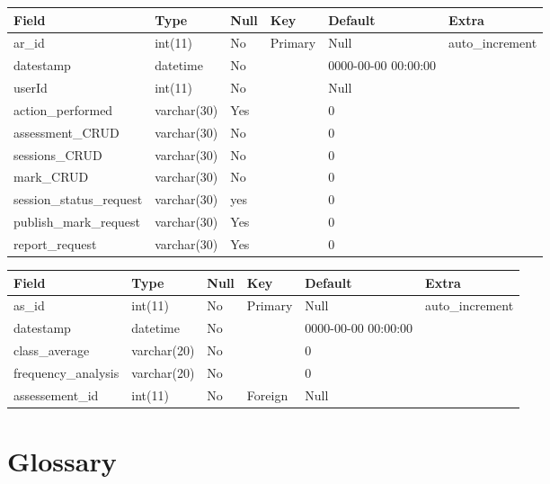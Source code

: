 \documentclass[12pt]{article}
\begin{document}
					
					
					\begin{tabular}{|p{1.1in}|p{0.9in}|p{0.5in}|p{0.4in}|p{1.0in}|p{0.9in}|} \hline 
					Field & Type & Null & Key & Default & Extra \\ \hline 
					ar\_id & int(11) & No & Primary & Null & auto\_increment \\ \hline 
					datestamp & datetime & No &  & 0000-00-00 00:00:00 &  \\ \hline 
					userId & int(11) & No &  & Null &  \\ \hline 
					action\_performed & varchar(30) & Yes &  & 0 &  \\ \hline 
					assessment\_CRUD & varchar(30) & No &  & 0 &  \\ \hline 
					sessions\_CRUD & varchar(30) & No &  & 0 &  \\ \hline 
					mark\_CRUD & varchar(30) & No &  & 0 &  \\ \hline 
					session\_status\_request & varchar(30) & yes &  & 0 &  \\ \hline 
					publish\_mark\_request & varchar(30) & Yes &  & 0 &  \\ \hline 
					report\_request & varchar(30) & Yes &  & 0 &  \\ \hline 
					\end{tabular}
					
					
					\begin{tabular}{|p{1.0in}|p{1.0in}|p{0.4in}|p{0.4in}|p{1.0in}|p{0.9in}|} \hline 
					Field & Type & Null & Key & Default & Extra \\ \hline 
					as\_id & int(11) & No & Primary & Null & auto\_increment \\ \hline 
					datestamp & datetime & No &  & 0000-00-00 00:00:00 &  \\ \hline 
					class\_average & varchar(20) & No &  & 0 &  \\ \hline 
					frequency\_analysis & varchar(20) & No &  & 0 &  \\ \hline 
					assessement\_id & int(11) & No & Foreign & Null &  \\ \hline 
					\end{tabular}
				\vspace{0.2in}
			
			
	
	
		
		
	\newpage
	\section{Glossary}
	
		\vspace{0.2in}
		
			
	
	
\end{document}
